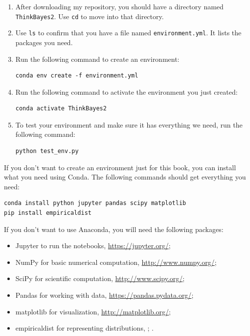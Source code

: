 \documentclass[12pt]{book}
\theoremstyle{exercise}
\newcommand{\py}[1]{{\tt #1}}%
\begin{document}
\begin{enumerate}

\item After downloading my repository, you should have a directory named \py{ThinkBayes2}.  Use \py{cd} to move into that directory.

\item Use \py{ls} to confirm that you have a file named \py{environment.yml}.  It lists the packages you need.

\item Run the following command to create an environment:

\begin{verbatim}
conda env create -f environment.yml
\end{verbatim}

\item Run the following command to activate the environment you just created:

\begin{verbatim}
conda activate ThinkBayes2
\end{verbatim}

\item To test your environment and make sure it has everything we need, run the following command:

\begin{verbatim}
python test_env.py
\end{verbatim}

\end{enumerate}

If you don't want to create an environment just for this book, you can install what you need using Conda.
The following commands should get everything you need:

\begin{verbatim}
conda install python jupyter pandas scipy matplotlib
pip install empiricaldist
\end{verbatim}

If you don't want to use Anaconda, you will need the following
packages:

\begin{itemize}

\item Jupyter to run the notebooks, \url{https://jupyter.org/};

\item NumPy for basic numerical computation, \url{http://www.numpy.org/};

\item SciPy for scientific computation, \url{http://www.scipy.org/};

\item Pandas for working with data, \url{https://pandas.pydata.org/};

\item matplotlib for visualization, \url{http://matplotlib.org/};

\item empiricaldist for representing distributions, \url{};
.

\end{itemize}
\end{document}
